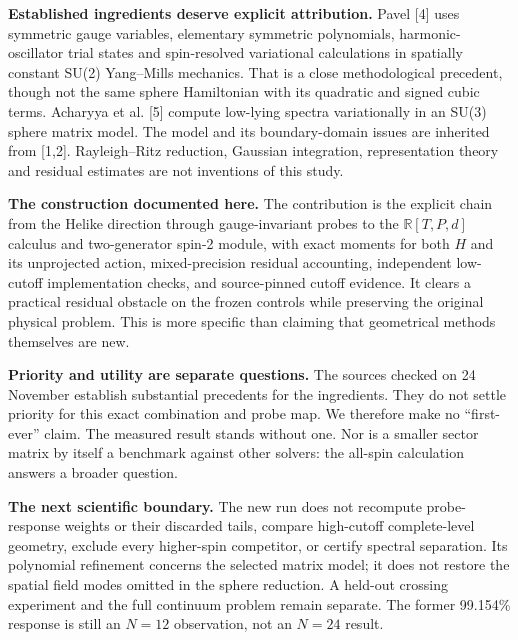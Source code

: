 \documentclass[11pt,letterpaper]{article}
\theoremstyle{plain}
\theoremstyle{definition}
\begin{document}
\textbf{Established ingredients deserve explicit attribution.}
Pavel [4] uses symmetric gauge variables, elementary symmetric polynomials,
harmonic-oscillator trial states and spin-resolved variational calculations in
spatially constant SU(2) Yang--Mills mechanics. That is a close methodological
precedent, though not the same sphere Hamiltonian with its quadratic and signed
cubic terms. Acharyya et al. [5] compute low-lying spectra variationally in an
SU(3) sphere matrix model. The model and its boundary-domain issues are inherited
from [1,2]. Rayleigh--Ritz reduction, Gaussian integration, representation theory
and residual estimates are not inventions of this study.

\textbf{The construction documented here.}
The contribution is the explicit chain from the Helike direction through
gauge-invariant probes to the $\mathbb R[T,P,d]$ calculus and two-generator
spin-2 module, with exact moments for both $H$ and its unprojected action,
mixed-precision residual accounting, independent low-cutoff implementation
checks, and source-pinned cutoff evidence. It clears a practical residual
obstacle on the frozen controls while preserving the original physical problem.
This is more specific than claiming that geometrical methods themselves are new.

\textbf{Priority and utility are separate questions.}
The sources checked on 24 November establish substantial precedents for the
ingredients. They do not settle priority for this exact combination and probe
map. We therefore make no ``first-ever'' claim. The measured result stands
without one. Nor is a smaller sector matrix by itself a benchmark against
other solvers: the all-spin calculation answers a broader question.

\textbf{The next scientific boundary.}
The new run does not recompute probe-response weights or their discarded tails,
compare high-cutoff complete-level geometry, exclude every higher-spin competitor,
or certify spectral separation. Its polynomial refinement concerns the selected
matrix model; it does not restore the spatial field modes omitted in the sphere
reduction. A held-out crossing experiment and the full continuum problem remain
separate. The former 99.154\% response is still an $N=12$ observation, not an
$N=24$ result.
\end{document}

